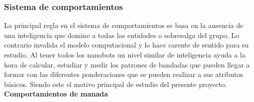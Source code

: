 \subsubsection{Sistema de comportamientos}
\label{sec:sistema_comportamientos}

La principal regla en el sistema de comportamientos se basa en la ausencia de una inteligencia que domine a todas las entidades o sobresalga del grupo. Lo contrario invalida el modelo computacional y lo hace carente de sentido para su estudio. Al tener todos los nanobots un nivel similar de inteligencia ayuda a la hora de calcular, estudiar y medir los patrones de bandadas que pueden llegar a formar con las diferentes  ponderaciones que se pueden realizar a sus atributos básicos. Siendo este el motivo principal de estudio del presente proyecto.\\

\noindent\textbf{Comportamientos de manada}

